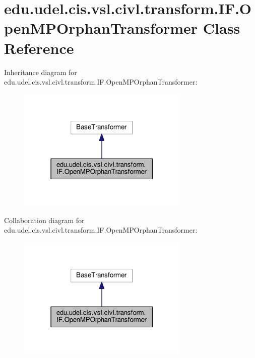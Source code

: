 \hypertarget{classedu_1_1udel_1_1cis_1_1vsl_1_1civl_1_1transform_1_1IF_1_1OpenMPOrphanTransformer}{}\section{edu.\+udel.\+cis.\+vsl.\+civl.\+transform.\+I\+F.\+Open\+M\+P\+Orphan\+Transformer Class Reference}
\label{classedu_1_1udel_1_1cis_1_1vsl_1_1civl_1_1transform_1_1IF_1_1OpenMPOrphanTransformer}


Inheritance diagram for edu.\+udel.\+cis.\+vsl.\+civl.\+transform.\+I\+F.\+Open\+M\+P\+Orphan\+Transformer\+:
\nopagebreak
\begin{figure}[H]
\begin{center}
\leavevmode
\includegraphics[width=231pt]{classedu_1_1udel_1_1cis_1_1vsl_1_1civl_1_1transform_1_1IF_1_1OpenMPOrphanTransformer__inherit__graph}
\end{center}
\end{figure}


Collaboration diagram for edu.\+udel.\+cis.\+vsl.\+civl.\+transform.\+I\+F.\+Open\+M\+P\+Orphan\+Transformer\+:
\nopagebreak
\begin{figure}[H]
\begin{center}
\leavevmode
\includegraphics[width=231pt]{classedu_1_1udel_1_1cis_1_1vsl_1_1civl_1_1transform_1_1IF_1_1OpenMPOrphanTransformer__coll__graph}
\end{center}
\end{figure}
